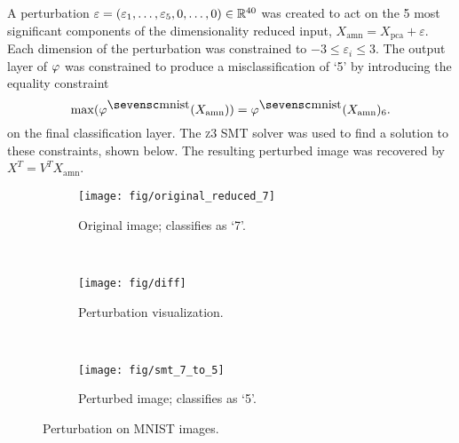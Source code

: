 A perturbation $\varepsilon = (\varepsilon_1, \ldots,
\varepsilon_5, 0, \ldots, 0) \in \mathbb{R}^{40}$ was created to act on the 5 most significant
components of the dimensionality reduced input, $X_\mathrm{amn} =
X_\mathrm{pca} + \varepsilon$.
Each dimension of the perturbation was constrained to $-3 \leq \varepsilon_i
\leq 3$.  
The output layer of $\varphi$ was constrained to produce a misclassification of
`5' by introducing the equality constraint
\[
\max(\amn^\mathsc{mnist}(X_\mathrm{amn})) =
\amn^\mathsc{mnist}(X_\mathrm{amn})_6.
\]
on the final classification layer.
The \textsc{z3} SMT solver was used to find a solution to these constraints,
shown below.  The resulting perturbed image was recovered by $X^T =
V^{T}X_\mathrm{amn}$.

\begin{figure}[htbp]
	\begin{subfigure}{.30\textwidth}
		\centering
		\texttt{[image: fig/original\_reduced\_7]}
		\caption{Original image; classifies as `7'.}
		\label{fig:HOG_resolution}
	\end{subfigure}
	~
	\begin{subfigure}{.30\textwidth}
		\centering
		\texttt{[image: fig/diff]}
		\caption{Perturbation visualization.}
		\label{fig:block_overlap}
	\end{subfigure}
	~
	\begin{subfigure}{.30\textwidth}
		\centering
		\texttt{[image: fig/smt\_7\_to\_5]}
		\caption{Perturbed image; classifies as `5'.}
		\label{fig:Peturbed_image}
	\end{subfigure}
	\caption{Perturbation on MNIST images.}
	\label{fig:MNIST_result}
\end{figure}

